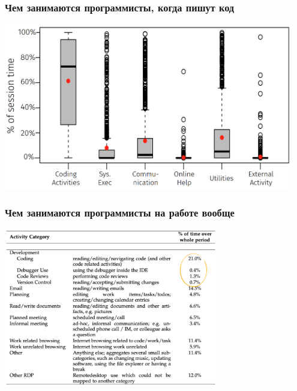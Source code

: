 \documentclass{../../slides-style}
\begin{document}
    \begin{frame}
        \frametitle{Чем занимаются программисты, когда пишут код}
        \begin{center}
            \includegraphics[width=0.95\textwidth]{timeSpentDuringWorkingSession.png}
        \end{center}
    \end{frame}

    \begin{frame}
        \frametitle{Чем занимаются программисты на работе вообще}
        \begin{center}
            \includegraphics[width=0.7\textwidth]{timeSpentTotal.png}
        \end{center}
    \end{frame}
\end{document}

